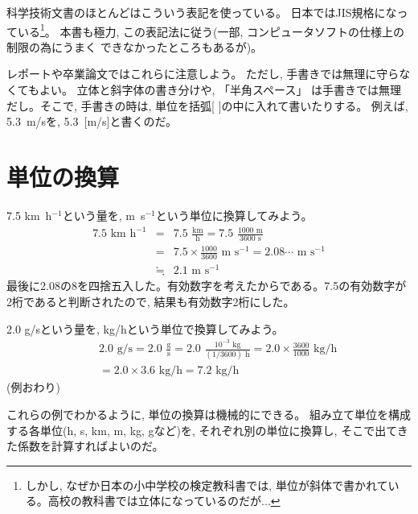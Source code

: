 科学技術文書のほとんどはこういう表記を使っている。
日本ではJIS規格になっている\footnote{しかし, なぜか日本の小中学校の検定教科書では, 
単位が斜体で書かれている。高校の教科書では立体になっているのだが...}。
本書も極力, この表記法に従う(一部, コンピュータソフトの仕様上の制限の為にうまく
できなかったところもあるが)。

レポートや卒業論文ではこれらに注意しよう。
ただし, 手書きでは無理に守らなくてもよい。
立体と斜字体の書き分けや, 「半角スペース」
は手書きでは無理だし。そこで, 手書きの時は, 
単位を括弧[ ]の中に入れて書いたりする。
例えば, 5.3~m/sを, 5.3~[m/s]と書くのだ。\\



\section{単位の換算}
\begin{exmpl}\label{exmpl:7.5km/h} 7.5 km~h$^{-1}$という量を, m~s$^{-1}$という単位に換算してみよう。
\begin{eqnarray}
7.5\,\,\text{km h}^{-1}&=&7.5\,\,\frac{\text{km}}{\text{h}}=7.5\,\,\frac{1000\text{ m}}{3600\text{ s}}\nonumber\\
&=&7.5\times\frac{1000}{3600}\text{ m s}^{-1}=2.08\cdots\text{ m s}^{-1}\nonumber\\
&\fallingdotseq&2.1\text{ m s}^{-1}
\end{eqnarray}
最後に2.08の8を四捨五入した。有効数字を考えたからである。7.5の有効数字が2桁であると判断されたので, 結果も有効数字2桁にした。\end{exmpl}

\begin{exmpl}\label{exmpl:2.0g/s} 2.0 g/sという量を, kg/hという単位で換算してみよう。
\begin{eqnarray}
&&2.0\,\,\text{g/s}=2.0\,\,\frac{\text{g}}{\text{s}}=2.0\,\,\frac{10^{-3}\text{ kg}}{(1/3600)\text{ h}}
=2.0\times\frac{3600}{1000}\text{ kg/h}\nonumber\\
&&=2.0\times3.6\text{ kg/h}=7.2\text{ kg/h}
\end{eqnarray}
(例おわり)\end{exmpl}\mv

これらの例でわかるように, 単位の換算は機械的にできる。
組み立て単位を構成する各単位(h, s, km, m, kg, gなど)を, 
それぞれ別の単位に換算し, そこで出てきた係数を計算すればよいのだ。\mv

